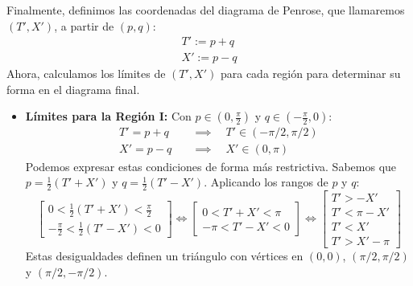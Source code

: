Finalmente, definimos las coordenadas del diagrama de Penrose, que llamaremos $(T', X')$, a partir de $(p, q)$:
\begin{equation}
  \begin{array}{l}
    T' := p+q \\
    X' := p-q
  \end{array}
\end{equation}
Ahora, calculamos los límites de $(T', X')$ para cada región para determinar su forma en el diagrama final.

\begin{itemize}
  \item \textbf{Límites para la Región I:} Con $p \in (0, \frac{\pi}{2})$ y $q \in (-\frac{\pi}{2}, 0)$:
        \begin{align*}
          T' = p+q \quad & \implies \quad T' \in (-\pi/2, \pi/2) \\
          X' = p-q \quad & \implies \quad X' \in (0, \pi)
        \end{align*}
        Podemos expresar estas condiciones de forma más restrictiva. Sabemos que $p = \frac{1}{2}(T'+X')$ y $q = \frac{1}{2}(T'-X')$. Aplicando los rangos de $p$ y $q$:
        \begin{equation}
          \left[\begin{array}{c}
              0 < \frac{1}{2}(T'+X') < \frac{\pi}{2} \\
              -\frac{\pi}{2} < \frac{1}{2}(T'-X') < 0
            \end{array}\right] \Leftrightarrow \left[\begin{array}{c}
              0 < T'+X' < \pi \\
              -\pi < T'-X' < 0
            \end{array}\right] \Leftrightarrow
          \left[\begin{array}{c}
              T' > -X'    \\
              T' < \pi-X' \\
              T' < X'     \\
              T' > X'-\pi
            \end{array}\right]
        \end{equation}
        Estas desigualdades definen un triángulo con vértices en $(0,0)$, $(\pi/2, \pi/2)$ y $(\pi/2, -\pi/2)$.


\end{itemize}
